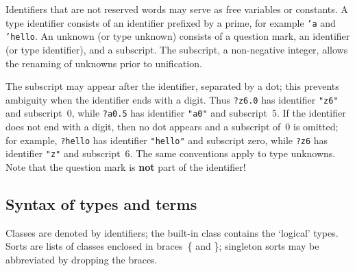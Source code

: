 Identifiers that are not reserved words may serve as free variables or
constants.  A type identifier consists of an identifier prefixed by a
prime, for example {\tt'a} and \hbox{\tt'hello}.  An unknown (or type
unknown) consists of a question mark, an identifier (or type identifier),
and a subscript.  The subscript, a non-negative integer, allows the
renaming of unknowns prior to unification.

The subscript may appear after the identifier, separated by a dot; this
prevents ambiguity when the identifier ends with a digit.  Thus {\tt?z6.0}
has identifier \verb|"z6"| and subscript~0, while {\tt?a0.5} has identifier
\verb|"a0"| and subscript~5.  If the identifier does not end with a digit,
then no dot appears and a subscript of~0 is omitted; for example,
{\tt?hello} has identifier \verb|"hello"| and subscript zero, while
{\tt?z6} has identifier \verb|"z"| and subscript~6.  The same conventions
apply to type unknowns.  Note that the question mark is {\bf not} part of the
identifier! 


\subsection{Syntax of types and terms}
Classes are denoted by identifiers; the built-in class 
contains the `logical' types.  Sorts are lists of classes enclosed in
braces~\{ and \}; singleton sorts may be abbreviated by dropping the braces.

